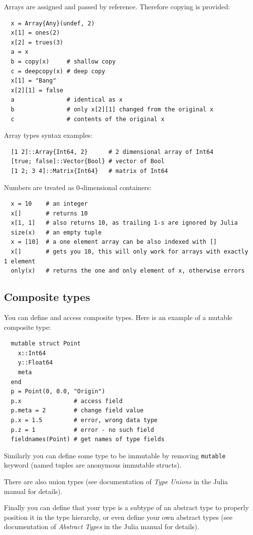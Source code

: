 \documentclass[10pt,a4paper]{article}
\begin{document}
Arrays are assigned and passed by reference. Therefore copying is provided:
\begin{lstlisting}
  x = Array{Any}(undef, 2)
  x[1] = ones(2)
  x[2] = trues(3)
  a = x
  b = copy(x)     # shallow copy
  c = deepcopy(x) # deep copy
  x[1] = "Bang"
  x[2][1] = false
  a               # identical as x
  b               # only x[2][1] changed from the original x
  c               # contents of the original x
\end{lstlisting}

Array types syntax examples:
\begin{lstlisting}
  [1 2]::Array{Int64, 2}      # 2 dimensional array of Int64
  [true; false]::Vector{Bool} # vector of Bool
  [1 2; 3 4]::Matrix{Int64}   # matrix of Int64
\end{lstlisting}

Numbers are treated as 0-dimensional containers:
\begin{lstlisting}
  x = 10    # an integer
  x[]       # returns 10
  x[1, 1]   # also returns 10, as trailing 1-s are ignored by Julia
  size(x)   # an empty tuple
  x = [10]  # a one element array can be also indexed with []
  x[]       # gets you 10, this will only work for arrays with exactly 1 element
  only(x)   # returns the one and only element of x, otherwise errors
\end{lstlisting}

\subsection{Composite types}
You can define and access composite types. Here is an example of a mutable composite type:
\begin{lstlisting}
  mutable struct Point
    x::Int64
    y::Float64
    meta
  end
  p = Point(0, 0.0, "Origin")
  p.x               # access field
  p.meta = 2        # change field value
  p.x = 1.5         # error, wrong data type
  p.z = 1           # error - no such field
  fieldnames(Point) # get names of type fields
\end{lstlisting}

Similarly you can define some type to be immutable by removing
\lstinline|mutable| keyword (named tuples are anonymous immutable structs).

There are also union types (see documentation of \emph{Type Unions} in the Julia
manual for details).

Finally you can define that your type is a subtype of an abstract type to
properly position it in the type hierarchy, or even define your own abstract
types (see documentation of \emph{Abstract Types} in the Julia manual for
details).
\end{document}
